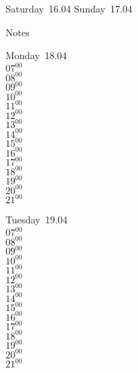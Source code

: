 \documentclass[11pt,a4paper]{book}\usepackage[]{graphicx}\usepackage[]{color}
\begin{document}
\begin{weekendbox}
  Saturday~16.04
  \tcblower
  Sunday~17.04
\end{weekendbox} %
\begin{notebox}
  Notes
\end{notebox}
\clearpage
\begin{headerbox}
\end{headerbox}
\begin{weekdaybox}
  Monday~18.04\\
  { 
  \vfill
  $07^{00}$\\
$08^{00}$\\
$09^{00}$\\
$10^{00}$\\
$11^{00}$\\
$12^{00}$\\
$13^{00}$\\
$14^{00}$\\
$15^{00}$\\
$16^{00}$\\
$17^{00}$\\
$18^{00}$\\
$19^{00}$\\
$20^{00}$\\
$21^{00}$\\
  }
\end{weekdaybox}
\begin{weekdaybox}
  Tuesday~19.04\\
  { 
  \vfill
  $07^{00}$\\
$08^{00}$\\
$09^{00}$\\
$10^{00}$\\
$11^{00}$\\
$12^{00}$\\
$13^{00}$\\
$14^{00}$\\
$15^{00}$\\
$16^{00}$\\
$17^{00}$\\
$18^{00}$\\
$19^{00}$\\
$20^{00}$\\
$21^{00}$\\
  }
\end{weekdaybox}
\end{document}
